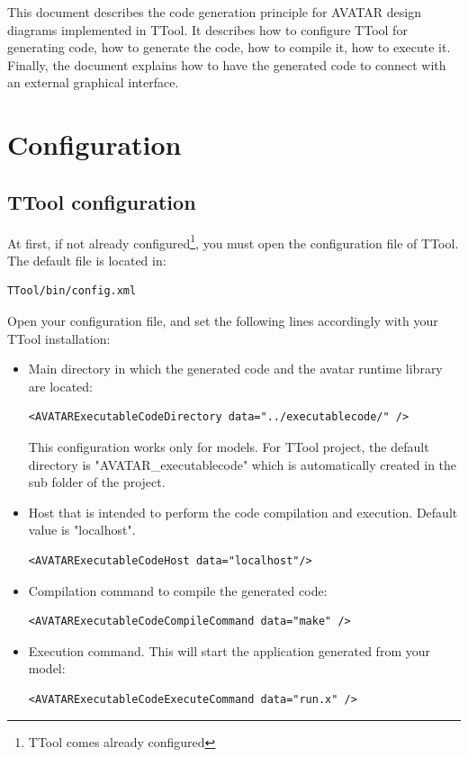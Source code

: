 \documentclass[12pt]{article}
\begin{document}
This document describes the code generation principle for AVATAR design diagrams implemented in TTool. It describes how to configure TTool for generating code, how to generate the code, how to compile it, how to execute it.
Finally, the document explains how to have the generated code to connect with an external graphical interface.

\newpage

\section{Configuration}\label{sec:conf}
\subsection{TTool configuration}
At first, if not already configured\footnote{TTool comes already configured}, you must open the configuration file of TTool. The default file is located in:
\begin{verbatim}
TTool/bin/config.xml
\end{verbatim}
Open your configuration file, and set the following lines accordingly with your TTool installation:
\begin{itemize}
\item Main directory in which the generated code and the avatar runtime library are located:
\begin{verbatim}
<AVATARExecutableCodeDirectory data="../executablecode/" />
\end{verbatim}
This configuration works only for models. For TTool project, the default directory is "AVATAR_executablecode" which is automatically created in the sub folder of the project.
\item Host that is intended to perform the code compilation and execution. Default value is "localhost".
\begin{verbatim}
<AVATARExecutableCodeHost data="localhost"/>
\end{verbatim}
\item Compilation command to compile the generated code:
\begin{verbatim}
<AVATARExecutableCodeCompileCommand data="make" />
\end{verbatim}
\item Execution command. This will start the application generated from your model:
\begin{verbatim}
<AVATARExecutableCodeExecuteCommand data="run.x" />
\end{verbatim}
\end{itemize}
\end{document}
